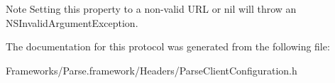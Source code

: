 \begin{DoxyNote}{Note}
Setting this property to a non-\/valid U\+R\+L or {\ttfamily nil} will throw an {\ttfamily N\+S\+Invalid\+Argument\+Exception}. 
\end{DoxyNote}


The documentation for this protocol was generated from the following file\+:\begin{DoxyCompactItemize}
\item 
Frameworks/\+Parse.\+framework/\+Headers/Parse\+Client\+Configuration.\+h\end{DoxyCompactItemize}
